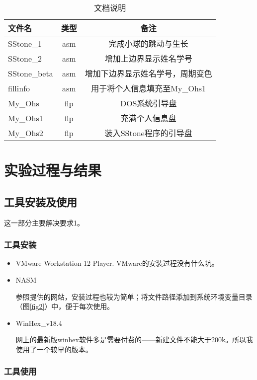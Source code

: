 \documentclass[a4paper,11pt,UTF8]{ctexart}
\begin{document}
	\begin{table}[!h!tbp]
		\caption{文档说明}\label{tab2}
		\centering
		\begin{tabular*}{0.85\textwidth}{@{\extracolsep{\fill}}lcc}
			\toprule
			文件名 &类型 &备注 \\
			\midrule
			SStone\_1 &asm     &完成小球的跳动与生长  \\
		    SStone\_2 &asm     &增加上边界显示姓名学号 \\
			SStone\_beta &asm  &增加下边界显示姓名学号，周期变色\\
			fillinfo &asm &用于将个人信息填充至My\_Ohs1 \\
			My\_Ohs &flp &DOS系统引导盘 \\
			My\_Ohs1 &flp &充满个人信息盘 \\
			My\_Ohs2 &flp &装入SStone程序的引导盘\\
			\bottomrule
		\end{tabular*}
	\end{table}

\section{实验过程与结果}

\subsection{工具安装及使用}

这一部分主要解决要求1。
\subsubsection{工具安装}

	\begin{itemize}
		\item VMware Workstation 12 Player. VMware的安装过程没有什么坑。
		
		\item NASM
		
		参照\cite{Orange's}提供的网站，安装过程也较为简单；将文件路径添加到系统环境变量目录（图\ref{fig2}）中，便于每次使用。
	
		\item WinHex\_v18.4
		
		网上的最新版winhex软件多是需要付费的——新建文件不能大于200k。所以我使用了一个较早的版本。	
	\end{itemize}

\subsubsection{工具使用}
\end{document}
